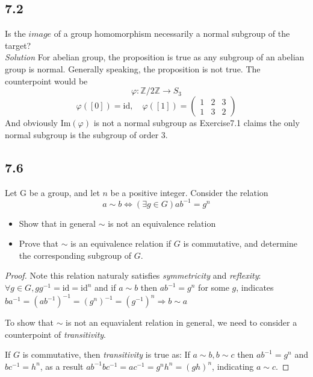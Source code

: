 \documentclass[a4paper, pdf, 12pt]{article}
\begin{document}
\subsection*{7.2}
Is the $image$ of a group homomorphism necessarily a normal subgroup of the
target?\\

\noindent
\textit{Solution}
  For abelian group, the proposition is true as any subgroup of an abelian group is normal.
  Generally speaking, the proposition is not true. The counterpoint would be
  $$
  \varphi: \mathbb{Z}/2\mathbb{Z} \rightarrow S_{3}
  $$
  $$
  \varphi([0]) = \mbox{id},\quad \varphi([1]) = \begin{pmatrix}
    1 & 2 & 3\\
    1 & 3 & 2
  \end{pmatrix}
  $$
  And obviously $\mbox{Im}(\varphi)$ is not a normal subgroup as Exercise7.1 claims
  the only normal subgroup is the subgroup of order 3.

\subsection*{7.6}
Let G be a group, and let $n$ be a positive integer. Consider the relation
$$
a\sim b \Leftrightarrow (\exists g\in G)ab^{-1} = g^{n}
$$
\begin{itemize}
  \item Show that in general $\sim$ is not an equivalence relation
  \item Prove that $\sim$ is an equivalence relation if $G$ is commutative, and determine the
corresponding subgroup of $G$.
\end{itemize}

\begin{proof}
  Note this relation naturaly satisfies \textit{symmetricity} and \textit{reflexity}:
  $\forall g\in G, gg^{-1} = \mbox{id} = \mbox{id}^{n}$ and if $a\sim b$ then $ab^{-1} = g^{n}$ 
  for some $g$, indicates $ba^{-1} = (ab^{-1})^{-1} = (g^{n})^{-1} = (g^{-1})^{n}\Rightarrow b\sim a$

  To show that $\sim$ is not an equavialent relation in general, we need to consider a counterpoint of \textit{transitivity}.

  If $G$ is commutative, then \textit{transitivity} is true as:
  If $a\sim b, b\sim c$ then $ab^{-1} = g^{n}$ and $bc^{-1} = h^{n}$, 
  as a result $ab^{-1}bc^{-1} = ac^{-1} = g^{n}h^{n} = (gh)^{n}$, indicating 
  $a\sim c$.
\end{proof}
\end{document}
